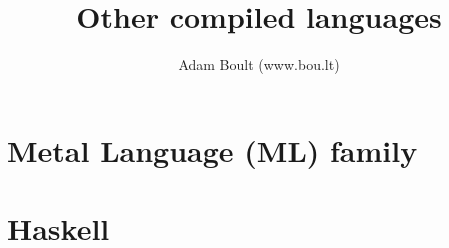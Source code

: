 \documentclass[oneside]{book}
\begin{document}
\author{Adam Boult (www.bou.lt)}
\title{Other compiled languages}
\maketitle

\setcounter{tocdepth}{0}
\tableofcontents



\part{Metal Language (ML) family}

\part{Haskell}
\end{document}

